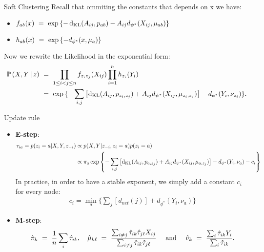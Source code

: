 \documentclass[aspectratio=169]{beamer}
\begin{document}
\begin{frame}{Soft Clustering}
    Recall that ommiting the constants that depends on x we have:
    \begin{itemize}
        \item $f_{ab}(x) \ = \  \exp{\{ -\operatorname{d}_{\rm KL}(A_{ij}, p_{ab}) -A_{ij} d_{\psi^*}(X_{ij},\mu_{ab}) \} }$
        \item $h_{ab}(x) \ = \  \exp{\{ -d_{\phi^*}(x, \mu_{a})\}}$
    \end{itemize}
    Now we rewrite the Likelihood in the exponential form:
    {\small
    \begin{align*}  
        \mathbb{P} \left( X,Y \, | \, z \right) & \ = \  \prod_{ 1\le i < j \le n } f_{z_i z_j}( X_{ij}) \prod_{i=1}^n h_{z_i} (Y_i)\\
         & \ = \  \exp{\{-\sum_{i,j}\left[ \operatorname{d}_{\rm KL}(A_{ij}, p_{z_i,z_j}) + A_{ij} d_{\psi^*}(X_{ij},\mu_{z_i,z_j})\right] - d_{\phi^*}(Y_i,\nu_{z_i}) \} }.
    \end{align*}
    }
\end{frame}

\begin{frame}{Update rule}
\begin{itemize}
    \item \textbf{E-step}:
        {\small
        \begin{align*}
            \tau_{ia} = p(z_i=a|X,Y, z_{-i}) & \propto p(X,Y| z_{-i}, z_i=a) p(z_i=a) \\
            & \propto \pi_a\exp{ \left\{ -\sum_{i,j}\left[\operatorname{d}_{\rm KL}(A_{ij}, p_{a,z_j}) + A_{ij} d_{\psi^*}(X_{ij},\mu_{a,z_j})\right] - d_{\phi^*}(Y_i,\nu_{a}) - c_i\right\} }
        \end{align*}
        }
    In practice, in order to have a stable exponent, we simply add a constant $c_i$ for every node:
    \begin{align*}
        c_i = \min_a \{\sum_{j}\left[ d_{net}(j)\right] + d_{\phi^*} (Y_i,\nu_{a})\}
    \end{align*}
    \item \textbf{M-step}:
        {\small
        \begin{align*}
         \hat{\pi}_k \ = \  \frac1n \sum_i \hat{\tau}_{ik},
         \quad 
         \hat{\mu}_{k\ell} \ = \  \frac{ \sum_{i \ne j} \hat{\tau}_{ik} \hat{\tau}_{j\ell} X_{ij} }{ \sum_{i \ne j} \hat{\tau}_{ik} \hat{\tau}_{j \ell} }
         \quad \text{ and } \quad 
         \hat{\nu}_k \ = \  \frac{ \sum_i \hat{\tau}_{ik} Y_{i} }{ \sum_i \hat{\tau}_{ik} }. 
        \end{align*}
        }
\end{itemize}

\end{frame}
\end{document}
